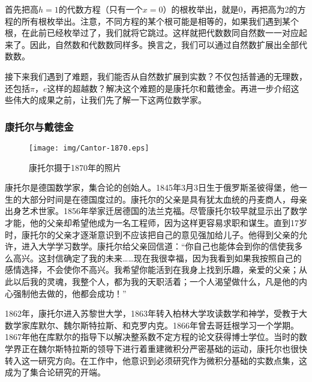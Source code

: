 \documentclass{article}
\begin{document}
\begin{enumerate}
首先把高$h=1$的代数方程（只有一个$x = 0$）的根枚举出，就是0，再把高为2的方程的所有根枚举出。注意，不同方程的某个根可能是相等的，如果我们遇到某个根，在此前已经枚举过了，我们就将它跳过。这样就把代数数同自然数一一对应起来了。因此，自然数和代数数同样多。换言之，我们可以通过自然数扩展出全部代数数。
\end{enumerate}

接下来我们遇到了难题，我们能否从自然数扩展到实数？不仅包括普通的无理数，还包括$\pi$，$e$这样的超越数？解决这个难题的是康托尔和戴徳金。再进一步介绍这些伟大的成果之前，让我们先了解一下这两位数学家。

\subsubsection{康托尔与戴徳金}

\begin{wrapfigure}{R}{0.4\textwidth}
 \centering
 \texttt{[image: img/Cantor-1870.eps]}
 \captionsetup{labelformat=empty}
 \caption{康托尔摄于1870年的照片}
 \label{fig:Cantor-1870}
\end{wrapfigure}

康托尔是德国数学家，集合论的创始人。1845年3月3日生于俄罗斯圣彼得堡，他一生的大部分时间是在德国度过的。康托尔的父亲是具有犹太血统的丹麦商人，母亲出身艺术世家。1856年举家迁居德国的法兰克福。尽管康托尔较早就显示出了数学才能，他的父亲却希望他成为一名工程师，因为这样更容易求职和谋生。直到17岁时，康托尔的父亲才逐渐意识到不应该把自己的意见强加给儿子。他得到父亲的允许，进入大学学习数学。康托尔给父亲回信道：“你自己也能体会到你的信使我多么高兴。这封信确定了我的未来……现在我很幸福，因为我看到如果我按照自己的感情选择，不会使你不高兴。我希望你能活到在我身上找到乐趣，亲爱的父亲；从此以后我的灵魂，我整个人，都为我的天职活着；一个人渴望做什么，凡是他的内心强制他去做的，他都会成功！”\cite{HanXueTao16}

1862年，康托尔进入苏黎世大学，1863年转入柏林大学攻读数学和神学，受教于大数学家库默尔、魏尔斯特拉斯、和克罗内克。1866年曾去哥廷根学习一个学期。1867年他在库默尔的指导下以解决整系数不定方程的论文获得博士学位。当时的数学界正在魏尔斯特拉斯的领导下进行着重建微积分严密基础的运动，康托尔也很快转入这一研究方向。在工作中，他意识到必须研究作为微积分基础的实数点集，这成为了集合论研究的开端。
\end{document}
